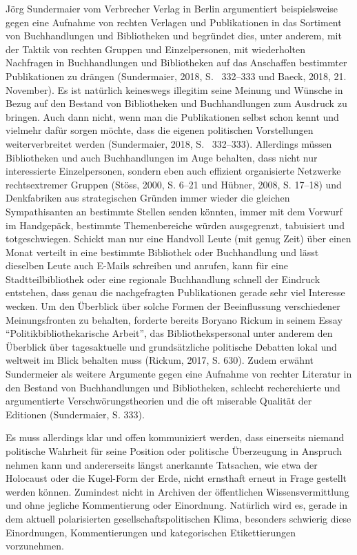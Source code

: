\documentclass[a4paper,
fontsize=11pt,
oneside,
numbers=noperiodatend,
parskip=half-,
bibliography=totoc,
final
]{scrartcl}
\begin{document}
Jörg Sundermaier vom Verbrecher Verlag in Berlin argumentiert
beispielsweise gegen eine Aufnahme von rechten Verlagen und
Publikationen in das Sortiment von Buchhandlungen und Bibliotheken und
begründet dies, unter anderem, mit der Taktik von rechten Gruppen und
Einzelpersonen, mit wiederholten Nachfragen in Buchhandlungen und
Bibliotheken auf das Anschaffen bestimmter Publikationen zu drängen
(Sundermaier, 2018, S. ~332--333 und Baeck, 2018, 21. November). Es ist
natürlich keineswegs illegitim seine Meinung und Wünsche in Bezug auf
den Bestand von Bibliotheken und Buchhandlungen zum Ausdruck zu bringen.
Auch dann nicht, wenn man die Publikationen selbst schon kennt und
vielmehr dafür sorgen möchte, dass die eigenen politischen Vorstellungen
weiterverbreitet werden (Sundermaier, 2018, S. ~332--333). Allerdings
müssen Bibliotheken und auch Buchhandlungen im Auge behalten, dass nicht
nur interessierte Einzelpersonen, sondern eben auch effizient
organisierte Netzwerke rechtsextremer Gruppen (Stöss, 2000, S. 6--21 und
Hübner, 2008, S. 17--18) und Denkfabriken aus strategischen Gründen
immer wieder die gleichen Sympathisanten an bestimmte Stellen senden
könnten, immer mit dem Vorwurf im Handgepäck, bestimmte Themenbereiche
würden ausgegrenzt, tabuisiert und totgeschwiegen. Schickt man nur eine
Handvoll Leute (mit genug Zeit) über einen Monat verteilt in eine
bestimmte Bibliothek oder Buchhandlung und lässt dieselben Leute auch
E-Mails schreiben und anrufen, kann für eine Stadtteilbibliothek oder
eine regionale Buchhandlung schnell der Eindruck entstehen, dass genau
die nachgefragten Publikationen gerade sehr viel Interesse wecken. Um
den Überblick über solche Formen der Beeinflussung verschiedener
Meinungsfronten zu behalten, forderte bereits Boryano Rickum in seinem
Essay \enquote{Politikbibliothekarische Arbeit}, das Bibliothekspersonal
unter anderem den Überblick über tagesaktuelle und grundsätzliche
politische Debatten lokal und weltweit im Blick behalten muss (Rickum,
2017, S. 630). Zudem erwähnt Sundermeier als weitere Argumente gegen
eine Aufnahme von rechter Literatur in den Bestand von Buchhandlungen
und Bibliotheken, schlecht recherchierte und argumentierte
Verschwörungstheorien und die oft miserable Qualität der Editionen
(Sundermaier, S. 333).

Es muss allerdings klar und offen kommuniziert werden, dass einerseits
niemand politische Wahrheit für seine Position oder politische
Überzeugung in Anspruch nehmen kann und andererseits längst anerkannte
Tatsachen, wie etwa der Holocaust oder die Kugel-Form der Erde, nicht
ernsthaft erneut in Frage gestellt werden können. Zumindest nicht in
Archiven der öffentlichen Wissensvermittlung und ohne jegliche
Kommentierung oder Einordnung. Natürlich wird es, gerade in dem aktuell
polarisierten gesellschaftspolitischen Klima, besonders schwierig diese
Einordnungen, Kommentierungen und kategorischen Etikettierungen
vorzunehmen.
\end{document}
